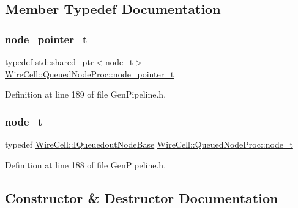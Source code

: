 \subsection{Member Typedef Documentation}
\mbox{\label{class_wire_cell_1_1_queued_node_proc_a0cfabdd31dec9b3648a1fc0e3cdb090b}} 
\subsubsection{\texorpdfstring{node\+\_\+pointer\+\_\+t}{node\_pointer\_t}}
{\footnotesize\ttfamily typedef std\+::shared\+\_\+ptr$<$\hyperlink{class_wire_cell_1_1_queued_node_proc_a7b820a1329c30cecec296f7fe9d0029b}{node\+\_\+t}$>$ \hyperlink{class_wire_cell_1_1_queued_node_proc_a0cfabdd31dec9b3648a1fc0e3cdb090b}{Wire\+Cell\+::\+Queued\+Node\+Proc\+::node\+\_\+pointer\+\_\+t}}



Definition at line 189 of file Gen\+Pipeline.\+h.

\mbox{\label{class_wire_cell_1_1_queued_node_proc_a7b820a1329c30cecec296f7fe9d0029b}} 
\subsubsection{\texorpdfstring{node\+\_\+t}{node\_t}}
{\footnotesize\ttfamily typedef \hyperlink{class_wire_cell_1_1_i_queuedout_node_base}{Wire\+Cell\+::\+I\+Queuedout\+Node\+Base} \hyperlink{class_wire_cell_1_1_queued_node_proc_a7b820a1329c30cecec296f7fe9d0029b}{Wire\+Cell\+::\+Queued\+Node\+Proc\+::node\+\_\+t}}



Definition at line 188 of file Gen\+Pipeline.\+h.



\subsection{Constructor \& Destructor Documentation}
\mbox{\label{class_wire_cell_1_1_queued_node_proc_a8c99324dae482663fccd443ecf69b559}} 
